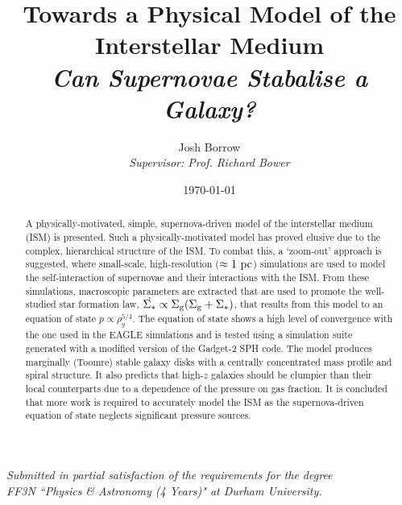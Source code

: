 
\begin{titlepage}

\thispagestyle{empty}

\author{Josh Borrow\\
\vspace{10mm}
\emph{Supervisor: Prof. Richard Bower}\\
\vspace{5mm}}
\date{\today}
\title{Towards a Physical Model of the Interstellar Medium\\
\vspace{4mm}
\large \emph{Can Supernovae Stabalise a Galaxy?}
\vspace{10mm}}
\maketitle

\vspace{10mm}

\begin{center}
\emph{{\small Submitted in partial satisfaction of the requirements for the degree}}\\
\emph{{\small FF3N ``Physics \& Astronomy (4 Years)" at Durham University.}}
\end{center}

\vspace{20mm}
\begin{abstract}
\noindent    A physically-motivated, simple, supernova-driven model of the interstellar medium (ISM) is presented.
    Such a physically-motivated model has proved elusive due to the complex, hierarchical structure of the ISM.
    To combat this, a `zoom-out' approach is suggested, where small-scale, high-resolution ($\approx 1 ~\mathrm{pc}$) simulations are used to model the self-interaction of supernovae and their interactions with the ISM.
    From these simulations, macroscopic parameters are extracted that are used to promote the well-studied star formation law, $\dot{\Sigma_*} \propto \Sigma_\mathrm{g} (\Sigma_\mathrm{g} + \Sigma_*)$, that results from this model to an equation of state $p \propto \rho_g^{5/4}$.
    The equation of state shows a high level of convergence with the one used in the EAGLE simulations and is tested using a simulation suite generated with a modified version of the Gadget-2 SPH code.
    The model produces marginally (Toomre) stable galaxy disks with a centrally concentrated  mass profile and spiral structure.
    It also predicts that high-$z$ galaxies should be clumpier than their local counterparts due to a dependence of the pressure on gas fraction.
    It is concluded that more work is required to accurately model the ISM as the supernova-driven equation of state neglects significant pressure sources.
\end{abstract}

\end{titlepage}

\newpage

